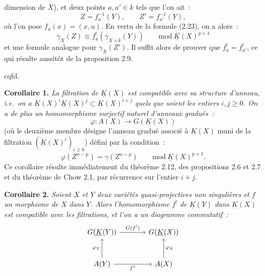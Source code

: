 dimension de $X$), et deux points $a,a'\in k$ tels que l'on ait~:
\[
 Z=f_a^{-1}(Y),\qquad Z'=f_{a'}^{-1}(Y),
\]
où l'on pose $f_u(x)=(x,u)$. En vertu de la formule (2.23), on a alors~:
\[
 \gamma_X(Z)\equiv f_a^!(\gamma_{X\times k}(Y))\qquad\mathrm{mod}\ \underline K(X)^{p+1}
\]
et une formule analogue pour $\gamma_X(Z')$. Il suffit alors de prouver que $f_a^!=f_{a'}^!$, ce qui résulte aussitôt de la proposition 2.9.
\begin{flushright}cqfd.\end{flushright}

\textbf{Corollaire 1.} \emph{La filtration de $\underline K(X)$ est compatible avec sa structure d'anneau, i.e.\ on a $\underline K(X)^i\underline K(X)^j\subset\underline K(X)^{i+j}$ quels que soient les entiers $i,j\geq0$. On a de plus un homomorphisme surjectif naturel d'anneaux gradués~:}
\begin{equation}\tag{2.34}
 \varphi:A(X)\longrightarrow G(\underline K(X))
\end{equation}
(où le deuxième membre désigne l'anneau gradué associé à $\underline K(X)$ muni de la filtration $(\underline K(X)^i)_{i\geq0}$) défini par la condition~:
\[
 \varphi(Z^{n-p})=\gamma(Z^{n-p})\qquad\mathrm{mod}\ \underline K(X)^{p+1}.
\]
Ce corollaire résulte immédiatement du théorème 2.12, des propositions 2.6 et 2.7 et du théorème de Chow 2.1, par récurrence sur l'entier $i+j$.

\textbf{Corollaire 2.} \emph{Soient $X$ et $Y$ deux variétés quasi-projectives non singulières et $f$ un morphisme de $X$ dans $Y$. Alors l'homomorphisme $f^!$ de $\underline K(Y)$ dans $\underline K(X)$ est compatible avec les filtrations, et l'on a un diagramme commutatif~:}
\[
\begin{tikzcd}[column sep=large,row sep=large]
G(\underline K(Y)) \arrow[r,"G(f^!)"] & G(\underline K(X))\\
A(Y) \arrow[r,"f^*"'] \arrow[u,"\varphi_Y"] & A(X) \arrow[u,"\varphi_X"']
\end{tikzcd}
\]
